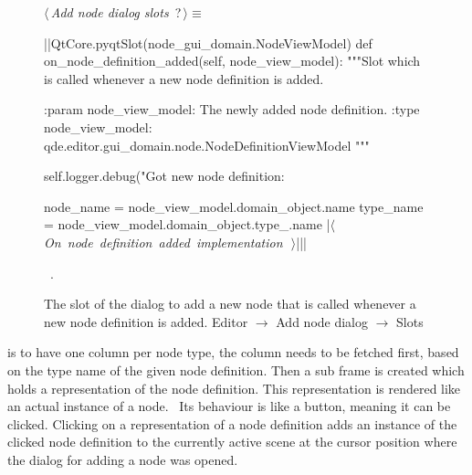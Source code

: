 \documentclass[%
    a4paper,    %
    justified,  %
    nobib,      %
    openany     %
]{tufte-book}
\makeatletter
\renewcommand{\label}[1]{\@tufte@label{##1}}%
\makeatother
\begin{document}
\begin{figure}
\begin{flushleft} \small
\begin{minipage}{\linewidth}\label{scrap153}\raggedright\small
{} $\langle\,${\itshape Add node dialog slots}\nobreak\ {\footnotesize {?}}$\,\rangle\equiv$
\vspace{-1ex}
\begin{pythoncode}
|\normalfont{}\fontfamily{}|QtCore.pyqtSlot(node_gui_domain.NodeViewModel)
def on_node_definition_added(self, node_view_model):
    """Slot which is called whenever a new node definition is added.

    :param node_view_model: The newly added node definition.
    :type  node_view_model: qde.editor.gui_domain.node.NodeDefinitionViewModel
    """

    self.logger.debug("Got new node definition: %

    node_name = node_view_model.domain_object.name
    type_name = node_view_model.domain_object.type_.name
    |\hbox{$\langle\,${\itshape On node definition added implementation}\nobreak\ {\footnotesize {}}$\,\rangle$}||\NWsep|
\end{pythoncode}
\vspace{1.5ex}
\footnotesize
\begin{list}{}{\setlength{\itemsep}{-\parsep}\setlength{\itemindent}{-\leftmargin}}
\item \NWtxtMacroRefIn\ .

\item{}
\end{list}
\end{minipage}\vspace{4ex}
\end{flushleft}
\caption{The slot of the dialog to add a new node that is called whenever a new
  node definition is added.
  \newline{}\newline{}Editor $\rightarrow$ Add node dialog $\rightarrow$ Slots}
\label{editor:lst:add-node-dialog:slots:on-node-definition-added}
\end{figure}

 is to have one column per node type, the
column needs to be fetched first, based on the type name of the given node
definition. Then a sub frame is created which holds a representation of the node
definition. This representation is rendered like an actual instance of a
node.~ Its behaviour is like a button,
meaning it can be clicked. Clicking on a representation of a node definition
adds an instance of the clicked node definition to the currently active scene at
the cursor position where the dialog for adding a node was opened.
\end{document}
